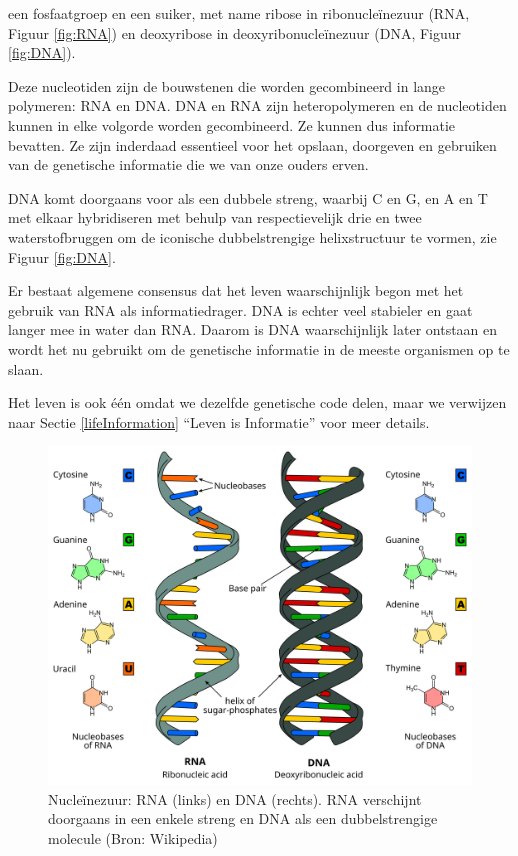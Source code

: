 \documentclass[
  11pt,
]{book}
\begin{document}
een fosfaatgroep en een suiker, met name ribose in ribonucleïnezuur (RNA, Figuur \ref{fig:RNA}) en deoxyribose in deoxyribonucleïnezuur (DNA, Figuur \ref{fig:DNA}).

Deze nucleotiden zijn de bouwstenen die worden gecombineerd in lange polymeren: RNA en DNA. DNA en RNA zijn heteropolymeren en de nucleotiden kunnen in elke volgorde worden gecombineerd. Ze kunnen dus informatie bevatten. Ze zijn inderdaad essentieel voor het opslaan, doorgeven en gebruiken van de genetische informatie die we van onze ouders erven.

DNA komt doorgaans voor als een dubbele streng, waarbij C en G, en A en T met elkaar hybridiseren met behulp van respectievelijk drie en twee waterstofbruggen om de iconische dubbelstrengige helixstructuur te vormen, zie Figuur \ref{fig:DNA}.

Er bestaat algemene consensus dat het leven waarschijnlijk begon met het gebruik van RNA als informatiedrager. DNA is echter veel stabieler en gaat langer mee in water dan RNA. Daarom is DNA waarschijnlijk later ontstaan en wordt het nu gebruikt om de genetische informatie in de meeste organismen op te slaan.

Het leven is ook één omdat we dezelfde genetische code delen, maar we verwijzen naar Sectie \ref{lifeInformation} ``Leven is Informatie'' voor meer details.

\begin{figure}

{\centering \includegraphics[width=0.5\linewidth]{./figs/Difference_DNA_RNA-EN} 

}

\caption{Nucleïnezuur: RNA (links) en DNA (rechts). RNA verschijnt doorgaans in een enkele streng en DNA als een dubbelstrengige molecule (Bron: Wikipedia)}\label{fig:RNAvsDNA}
\end{figure}
\end{document}
